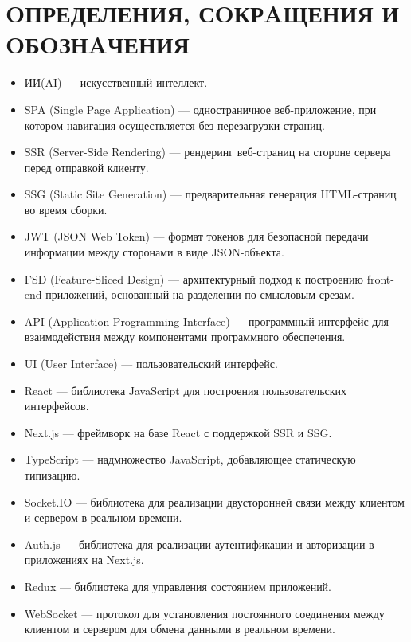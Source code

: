 \newpage
{}
\section*{OПРЕДЕЛЕНИЯ, СOКРAЩЕНИЯ И OБOЗНAЧЕНИЯ}

\begin{itemize}
  \item ИИ(AI) — искусственный интеллект.
  \item SPA (Single Page Application) — одностраничное веб-приложение, при котором навигация осуществляется без перезагрузки страниц.
  \item SSR (Server-Side Rendering) — рендеринг веб-страниц на стороне сервера перед отправкой клиенту.
  \item SSG (Static Site Generation) — предварительная генерация HTML-страниц во время сборки.
  \item JWT (JSON Web Token) — формат токенов для безопасной передачи информации между сторонами в виде JSON-объекта.
  \item FSD (Feature-Sliced Design) — архитектурный подход к построению front-end приложений, основанный на разделении по смысловым срезам.
  \item API (Application Programming Interface) — программный интерфейс для взаимодействия между компонентами программного обеспечения.
  \item UI (User Interface) — пользовательский интерфейс.
  \item React — библиотека JavaScript для построения пользовательских интерфейсов.
  \item Next.js — фреймворк на базе React с поддержкой SSR и SSG.
  \item TypeScript — надмножество JavaScript, добавляющее статическую типизацию.
  \item Socket.IO — библиотека для реализации двусторонней связи между клиентом и сервером в реальном времени.
  \item Auth.js — библиотека для реализации аутентификации и авторизации в приложениях на Next.js.
  \item Redux — библиотека для управления состоянием приложений.
  \item WebSocket — протокол для установления постоянного соединения между клиентом и сервером для обмена данными в реальном времени.
\end{itemize}

